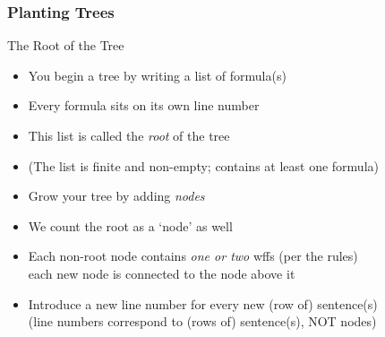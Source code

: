 \begin{frame}
\frametitle{Planting Trees}

  \begin{block}{The Root of the Tree}
    \begin{itemize}[<+->]
      \item[] You begin a tree by writing a list of formula(s)

\item Every formula sits on its own line number

  \item This list is called the \emph{root} of the tree

  \item[] (The list is finite and non-empty; contains at least one formula)
\end{itemize} 
\end{block}

\begin{itemize}[<+->]

\item Grow your tree by adding \emph{nodes}

\item We count the root as a `node' as well 

\item Each non-root node contains \textit{one or two} wffs (per the rules) \\ each new node is connected to the node above it


\item Introduce a new line number for every new (row of) sentence(s) \\ (line numbers correspond to (rows of) sentence(s), NOT nodes)

\end{itemize}
\end{frame}


